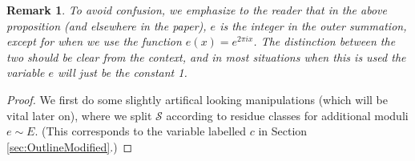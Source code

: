\documentclass[10pt]{amsart}
\theoremstyle{plain}
\newtheorem*{rmk}{Remark}
\numberwithin{equation}{section}
\begin{document}
%
%
%
%
%
%
%
%
\begin{rmk}
To avoid confusion, we emphasize to the reader that in the above proposition (and elsewhere in the paper), $e$ is the integer in the outer summation, except for when we use the function $e(x)=e^{2\pi i x}$. The distinction between the two should be clear from the context, and in most situations when this is used the variable $e$ will just be the constant 1.
\end{rmk}
%
%
%
%
%
%
%
%
\begin{proof}
We first do some slightly artifical looking manipulations (which will be vital later on), where we split $\mathscr{S}$ according to residue classes for additional moduli $e\sim E$. (This corresponds to the variable labelled $c$ in Section \ref{sec:OutlineModified}.)


\end{proof}
\end{document}
